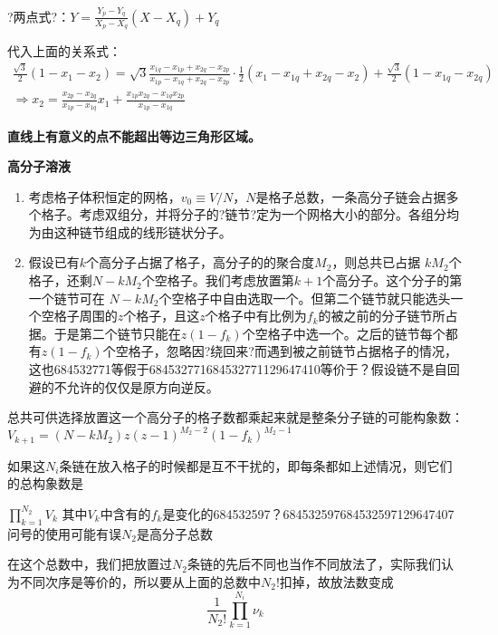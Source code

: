 \documentclass{article} %
\begin{document}
\noindent ?两点式?：$Y=\frac{Y_{p} -Y_{q} }{X_{p} -X_{q} } \left(X-X_{q} \right)+Y_{q} $

\noindent 代入上面的关系式：
\[\begin{array}{c} {\frac{\sqrt{3} }{2} \left(1-x_{1} -x_{2} \right)=\sqrt{3} \frac{x_{1q} -x_{1p} +x_{2q} -x_{2p} }{x_{1p} -x_{1q} +x_{2q} -x_{2p} } \cdot \frac{1}{2} \left(x_{1} -x_{1q} +x_{2q} -x_{2} \right)+\frac{\sqrt{3} }{2} \left(1-x_{1q} -x_{2q} \right)} \\ {\Rightarrow x_{2} =\frac{x_{2p} -x_{2q} }{x_{1p} -x_{1q} } x_{1} +\frac{x_{1p} x_{2q} -x_{1q} x_{2p} }{x_{1p} -x_{1q} } } \end{array}\] 


{\bf  直线上有意义的点不能超出等边三角形区域。}

\noindent \textbf{高分子溶液}

\begin{enumerate}
\item \textbf{ }考虑格子体积恒定的网格，$v_{0} \equiv V/N$，$N$是格子总数，一条高分子链会占据多个格子。考虑双组分，并将分子的?链节?定为一个网格大小的部分。各组分均为由这种链节组成的线形链状分子。

\item  假设已有$k$个高分子占据了格子，高分子的的聚合度$M_{2} $，则总共已占据 $kM_{2} $个格子，还剩$N-kM_{2} $个空格子。我们考虑放置第$k+1$个高分子。这个分子的第一个链节可在 $N-kM_{2} $个空格子中自由选取一个。但第二个链节就只能选头一个空格子周围的$z$个格子，且这$z$个格子中有比例为$f_{k} $的被之前的分子链节所占据。于是第二个链节只能在$z\left(1-f_{k} \right)$个空格子中选一个。之后的链节每个都有$z\left(1-f_{k} \right)$个空格子，忽略因?绕回来?而遇到被之前链节占据格子的情况，这也684532771等假于684532771684532771129647410等价于？假设链不是自回避的不允许的仅仅是原方向逆反。
\end{enumerate}

\noindent 总共可供选择放置这一个高分子的格子数都乘起来就是整条分子链的可能构象数：$V_{k+1} =\left(N-kM_{2} \right)z\left(z-1\right)^{M_{2} -2} \left(1-f_{k} \right)^{M_{2} -1} $

\noindent 如果这$N_{i} $条链在放入格子的时候都是互不干扰的，即每条都如上述情况，则它们的总构象数是

\noindent $\mathop{\prod }\limits_{k=1}^{N_{2} } V_{k} $   其中$V_{k} $中含有的$f_{k} $是变化的684532597？684532597684532597129647407问号的使用可能有误$N_{2} $是高分子总数

\noindent 在这个总数中，我们把放置过$N_{2} $条链的先后不同也当作不同放法了，实际我们认为不同次序是等价的，所以要从上面的总数中$N_{2} !$扣掉，故放法数变成
\[\frac{1}{N_{2} !} \mathop{\prod }\limits_{k=1}^{N_{i} } \nu _{k} \] 
\end{document}
